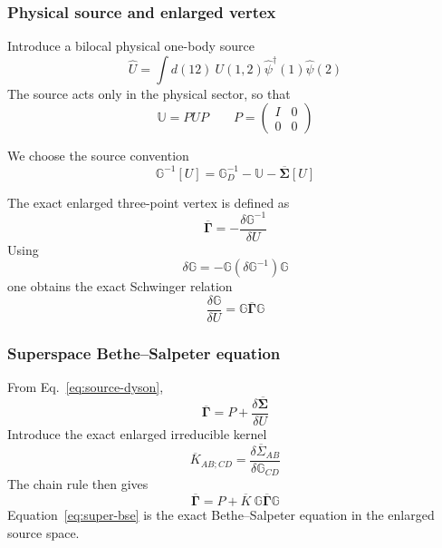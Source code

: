 \documentclass[aip,jcp,reprint,noshowkeys,superscriptaddress]{revtex4-1}
\begin{document}
\subsubsection{Physical source and enlarged vertex}

Introduce a bilocal physical one-body source
\begin{equation}
  \hat U
  =
  \int d(12)\
  U(1,2)
  \hat\psi^\dagger(1)
  \hat\psi(2)
\end{equation}
The source acts only in the physical sector, so that
\begin{equation}
  \mathbb U
  =
  PUP
  \qquad
  P
  =
  \begin{pmatrix}
    I & 0 \\
    0 & 0
  \end{pmatrix}
\end{equation}

We choose the source convention
\begin{equation}
  \mathbb G^{-1}[U]
  =
  \mathbb G_D^{-1}
  -
  \mathbb U
  -
  \overline{\boldsymbol\Sigma}[U]
  \label{eq:source-dyson}
\end{equation}

The exact enlarged three-point vertex is defined as
\begin{equation}
  \overline{\boldsymbol\Gamma}
  =
  -
  \frac{
    \delta\mathbb G^{-1}
  }{
    \delta U
  }
  \label{eq:super-vertex-def}
\end{equation}
Using
\begin{equation}
  \delta\mathbb G
  =
  -
  \mathbb G
  \left(
    \delta\mathbb G^{-1}
  \right)
  \mathbb G
\end{equation}
one obtains the exact Schwinger relation
\begin{equation}
  \frac{
    \delta\mathbb G
  }{
    \delta U
  }
  =
  \mathbb G
  \overline{\boldsymbol\Gamma}
  \mathbb G
  \label{eq:super-schwinger}
\end{equation}


\subsubsection{Superspace Bethe--Salpeter equation}

From Eq.~\eqref{eq:source-dyson},
\begin{equation}
  \overline{\boldsymbol\Gamma}
  =
  P
  +
  \frac{
    \delta\overline{\boldsymbol\Sigma}
  }{
    \delta U
  }
\end{equation}
Introduce the exact enlarged irreducible kernel
\begin{equation}
  \overline K_{AB;CD}
  =
  \frac{
    \delta\overline\Sigma_{AB}
  }{
    \delta\mathbb G_{CD}
  }
  \label{eq:super-kernel}
\end{equation}
The chain rule then gives
\begin{equation}
  \overline{\boldsymbol\Gamma}
  =
  P
  +
  \overline K
  \
  \mathbb G
  \overline{\boldsymbol\Gamma}
  \mathbb G
  \label{eq:super-bse}
\end{equation}
Equation~\eqref{eq:super-bse} is the exact Bethe--Salpeter equation in
the enlarged source space.
\end{document}
